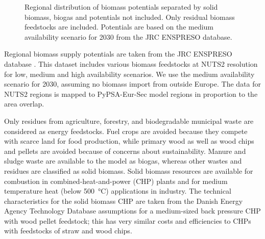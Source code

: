 \begin{figure}
    \centering
    \caption{Regional distribution of biomass potentials separated by solid biomass, biogas and potentials not included. Only residual biomass feedstocks are included. Potentials are based on the medium availability scenario for 2030 from the JRC ENSPRESO database.}
    \label{fig:biomass-potentials}
\end{figure}

Regional biomass supply potentials are taken from the JRC ENSPRESO database
. This dataset includes various biomass feedstocks at
NUTS2 resolution for low, medium and high availability scenarios.  We use the
medium availability scenario for 2030, assuming no biomass import from outside
Europe. The data for NUTS2 regions is mapped to PyPSA-Eur-Sec model regions in
proportion to the area overlap.

Only residues from agriculture, forestry, and biodegradable municipal
waste are considered as energy feedstocks. Fuel crops are avoided because they
compete with scarce land for food production, while primary wood as well as wood
chips and pellets are avoided because of concerns about sustainability.
Manure and sludge waste are available to the model as biogas, whereas other
wastes and residues are classified as solid biomass. Solid biomass resources are
available for combustion in combined-heat-and-power (CHP) plants and for medium
temperature heat (below \SI{500}{\celsius}) applications in industry.
The technical characteristics for the solid biomass CHP are taken from the
Danish Energy Agency Technology Database assumptions for a
medium-sized back pressure CHP with wood pellet feedstock; this has very similar
costs and efficiencies to CHPs with feedstocks of straw and wood chips.

